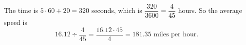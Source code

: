 The time is $5\cdot60+20=320$ seconds, which is $\dfrac{320}{3600}=\dfrac{4}{45}$ hours. So the average speed is
\[16.12\div\dfrac{4}{45}=\dfrac{16.12\cdot45}{4}=\boxed{181.35}\text{ miles per hour}.\]
